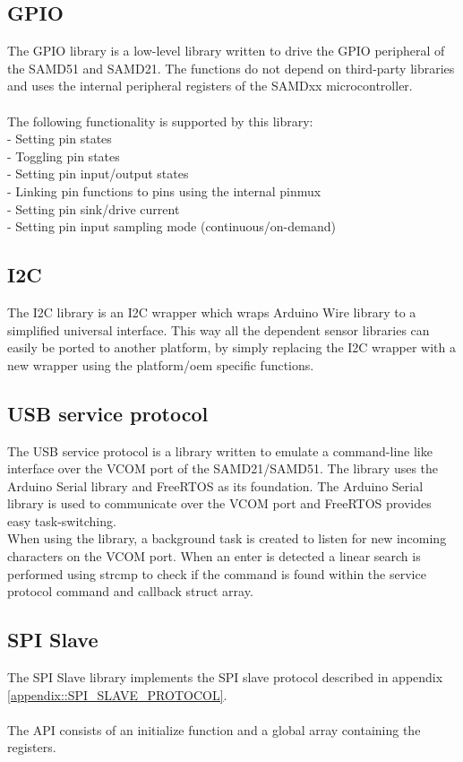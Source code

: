 \subsection{GPIO}
The GPIO library is a low-level library written to drive the GPIO peripheral of the SAMD51 and SAMD21. The functions do not depend on third-party libraries and uses the internal peripheral registers of the SAMDxx microcontroller.\\\\
The following functionality is supported by this library: \\
- Setting pin states \\
- Toggling pin states \\
- Setting pin input/output states \\
- Linking pin functions to pins using the internal pinmux \\
- Setting pin sink/drive current \\
- Setting pin input sampling mode (continuous/on-demand) \\

\subsection{I2C}
The I2C library is an I2C wrapper which wraps Arduino Wire library to a simplified universal interface. This way all the dependent sensor libraries can easily be ported to another platform, by simply replacing the I2C wrapper with a new wrapper using the platform/oem specific functions.
\subsection{USB service protocol}
The USB service protocol is a library written to emulate a command-line like interface over the VCOM port of the SAMD21/SAMD51. The library uses the Arduino Serial library and FreeRTOS as its foundation. The Arduino Serial library is used to communicate over the VCOM port and FreeRTOS provides easy task-switching. \\
When using the library, a background task is created to listen for new incoming characters on the VCOM port. When an enter is detected a linear search is performed using strcmp to check if the command is found within the service protocol command and callback struct array.
\subsection{SPI Slave}
The SPI Slave library implements the SPI slave protocol described in appendix \ref{appendix::SPI_SLAVE_PROTOCOL}. \\\\
The API consists of an initialize function and a global array containing the registers. 
